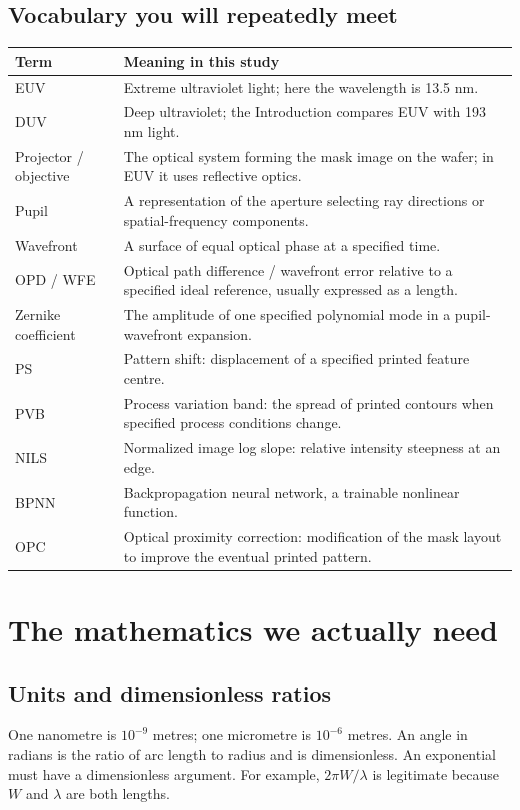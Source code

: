 \section{Vocabulary you will repeatedly meet}
\begin{longtable}{@{}p{}p{}@{}}
\toprule Term & Meaning in this study\\ \midrule\endhead
EUV & Extreme ultraviolet light; here the wavelength is 13.5 nm.\\
DUV & Deep ultraviolet; the Introduction compares EUV with 193 nm light.\\
Projector / objective & The optical system forming the mask image on
the wafer; in EUV it uses reflective optics.\\
Pupil & A representation of the aperture selecting ray directions or
spatial-frequency components.\\
Wavefront & A surface of equal optical phase at a specified time.\\
OPD / WFE & Optical path difference / wavefront error relative to a
specified ideal reference, usually expressed as a length.\\
Zernike coefficient & The amplitude of one specified polynomial mode
in a pupil-wavefront expansion.\\
PS & Pattern shift: displacement of a specified printed feature centre.\\
PVB & Process variation band: the spread of printed contours when
specified process conditions change.\\
NILS & Normalized image log slope: relative intensity steepness at an edge.\\
BPNN & Backpropagation neural network, a trainable nonlinear function.\\
OPC & Optical proximity correction: modification of the mask layout to
improve the eventual printed pattern.\\
\bottomrule
\end{longtable}

\chapter{The mathematics we actually need}\label{ch:math}
\section{Units and dimensionless ratios}
One nanometre is $10^{-9}$ metres; one micrometre is $10^{-6}$ metres.
An angle in radians is the ratio of arc length to radius and is dimensionless.
An exponential must have a dimensionless argument.
For example, $2\pi W/\lambda$ is legitimate because $W$ and $\lambda$
are both lengths.

